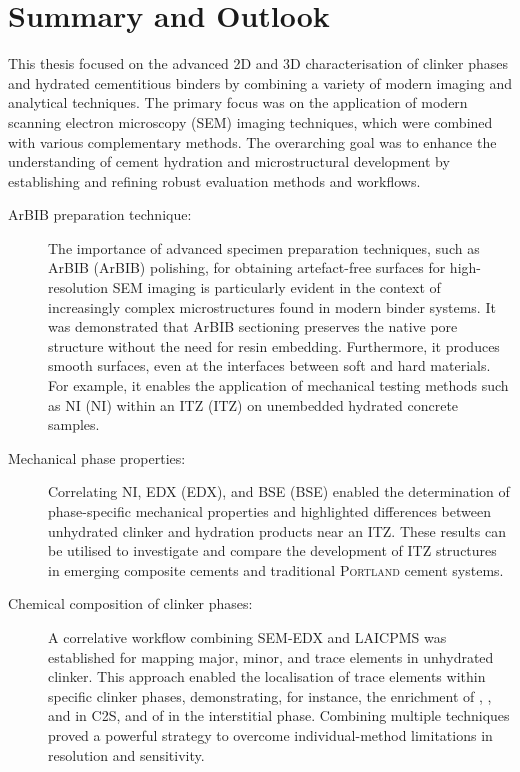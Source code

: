 \chapter{Summary and Outlook}

This thesis focused on the advanced 2D and 3D characterisation of clinker phases and hydrated cementitious binders by combining a variety of modern imaging and analytical techniques.
The primary focus was on the application of modern scanning electron microscopy (\ac{SEM}) imaging techniques, which were combined with various complementary methods.
The overarching goal was to enhance the understanding of cement hydration and microstructural development by establishing and refining robust evaluation methods and workflows.

\begin{description}

    \item[\ac{ArBIB} preparation technique:]
    The importance of advanced specimen preparation techniques, such as \acl{ArBIB} (\acs{ArBIB}) polishing, for obtaining artefact-free surfaces for high-resolution \ac{SEM} imaging is particularly evident in the context of increasingly complex microstructures found in modern binder systems.
    It was demonstrated that \ac{ArBIB} sectioning preserves the native pore structure without the need for resin embedding.
    Furthermore, it produces smooth surfaces, even at the interfaces between soft and hard materials.
    For example, it enables the application of mechanical testing methods such as \acl{NI} (\acs{NI}) within an \acl{ITZ} (\acs{ITZ}) on unembedded hydrated concrete samples.

    \item[Mechanical phase properties:] %
    Correlating \ac{NI}, \acl{EDX} (\acs{EDX}), and \acl{BSE} (\acs{BSE}) enabled the determination of phase-specific mechanical properties and highlighted differences between unhydrated clinker and hydration products near an \ac{ITZ}.
    These results can be utilised to investigate and compare the development of \ac{ITZ} structures in emerging composite cements and traditional \textsc{Portland} cement systems.

    \item[Chemical composition of clinker phases:]
    A correlative workflow combining \ac{SEM}-\ac{EDX} and \acl{LAICPMS} was established for mapping major, minor, and trace elements in unhydrated clinker.
    This approach enabled the localisation of trace elements within specific clinker phases, demonstrating, for instance, the enrichment of , , and  in \ac{C2S}, and of  in the interstitial phase.
    Combining multiple techniques proved a powerful strategy to overcome individual-method limitations in resolution and sensitivity.


\end{description}
